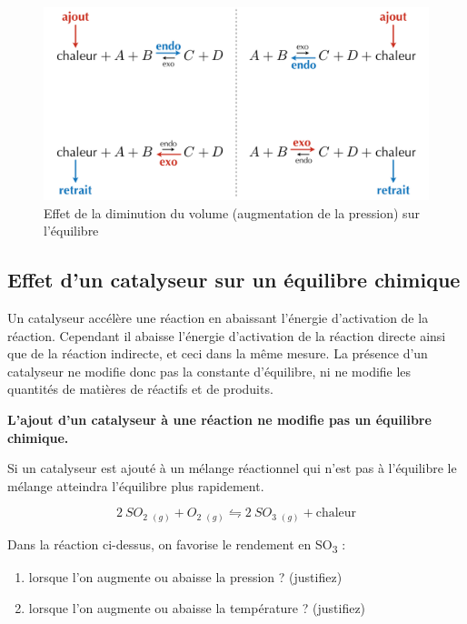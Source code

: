\documentclass[
  11pt,
  french,
  a4paper,
  openany]{book}
\providecommand{\tightlist}{%
  \setlength{\itemsep}{0pt}\setlength{\parskip}{0pt}}
\begin{document}
\begin{figure}

{\centering \includegraphics[width=0.75\linewidth]{images/equilibres-temperature-1} 

}

\caption{Effet de la diminution du volume (augmentation de la pression) sur l'équilibre}\label{fig:equilibres-temperature-1}
\end{figure}

\hypertarget{effet-dun-catalyseur-sur-un-uxe9quilibre-chimique}{%
\subsection{Effet d'un catalyseur sur un équilibre chimique}\label{effet-dun-catalyseur-sur-un-uxe9quilibre-chimique}}

Un catalyseur accélère une réaction en abaissant l'énergie d'activation de la réaction. Cependant il abaisse l'énergie d'activation de la réaction directe ainsi que de la réaction indirecte, et ceci dans la même mesure. La présence d'un catalyseur ne modifie donc pas la constante d'équilibre, ni ne modifie les quantités de matières de réactifs et de produits.

\textbf{L'ajout d'un catalyseur à une réaction ne modifie pas un équilibre chimique.}

Si un catalyseur est ajouté à un mélange réactionnel qui n'est pas à l'équilibre le mélange atteindra l'équilibre plus rapidement.

\begin{Exercise}

\[
  2\ SO_2\ _{(g)} + O_2\ _{(g)} \leftrightharpoons 2\ SO_3\ _{(g)} + \text{chaleur}
\]

Dans la réaction ci-dessus, on favorise le rendement en SO\textsubscript{3} :

\begin{enumerate}
\def\labelenumi{\alph{enumi}.}
\tightlist
\item
  lorsque l'on augmente ou abaisse la pression ? (justifiez)
\item
  lorsque l'on augmente ou abaisse la température ? (justifiez)
\end{enumerate}


\end{Exercise}
\end{document}

